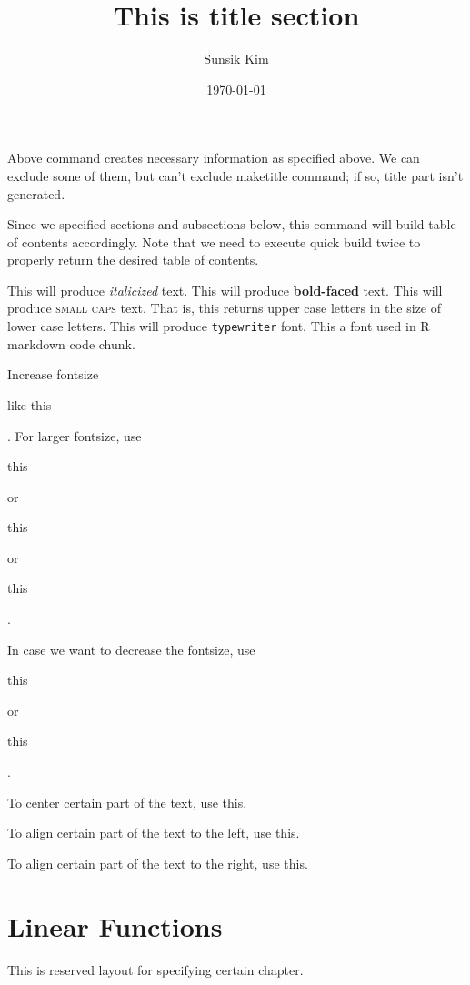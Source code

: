 \documentclass[11pt]{article}
\begin{document}
\title{This is title section}
\author{Sunsik Kim}
\date{\today}
\maketitle
Above command creates necessary information as specified above. We can exclude
some of them, but can't exclude maketitle command; if so, title part isn't
generated.

\tableofcontents
Since we specified sections and subsections below, this command will build table
of contents accordingly. Note that we need to execute quick build twice to properly
return the desired table of contents.

This will produce \textit{italicized} text. 
This will produce \textbf{bold-faced} text.
This will produce \textsc{small caps} text. That is, this returns upper case
letters in the size of lower case letters.
This will produce \texttt{typewriter} font. This a font used in R markdown code
chunk.

Increase fontsize 
\begin{large} like this \end{large}. 
For larger fontsize, use 
\begin{LARGE} this \end{LARGE} or 
\begin{huge} this \end{huge} or 
\begin{Huge} this \end{Huge}.

In case we want to decrease the fontsize, use 
\begin{small} this \end{small} or 
\begin{tiny} this \end{tiny}.

\begin{center}
To center certain part of the text, use this.
\end{center}

\begin{flushleft}
To align certain part of the text to the left, use this.
\end{flushleft}

\begin{flushright}
To align certain part of the text to the right, use this.
\end{flushright}

\section{Linear Functions}
This is reserved layout for specifying certain chapter.
\end{document}
